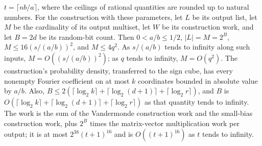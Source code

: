 \begin{theorem}
$t=\lceil nb/a\rceil$, where the ceilings of rational quantities are rounded up to
natural numbers. For the construction with these parameters, let $L$ be its output list,
let $M$ be the cardinality of its output multiset, let $W$ be its construction work, and
let $B=2d$ be its random-bit count. Then $0<a/b\le 1/2$, $|L|=M=2^B$,
$M\le16(s/(a/b))^2$, and $M\le4q^2$. As $s/(a/b)$ tends to infinity along such inputs,
$M=O((s/(a/b))^2)$; as $q$ tends to infinity, $M=O(q^2)$. The construction's probability
density, transferred to the sign cube, has every nonempty Fourier coefficient on at most
$k$ coordinates bounded in absolute value by $a/b$. Also, $B\le2(\lceil\log_2
k\rceil+\lceil\log_2(d+1)\rceil+\lceil\log_2 r\rceil)$, and $B$ is $O(\lceil\log_2
k\rceil+\lceil\log_2(d+1)\rceil+\lceil\log_2 r\rceil)$ as that quantity tends to
infinity. The work is the sum of the Vandermonde construction work and the small-bias
construction work, plus $2^B$ times the matrix-vector multiplication work per output; it
is at most $2^{38}(t+1)^{16}$ and is $O((t+1)^{16})$ as $t$ tends to infinity.
\end{theorem}
